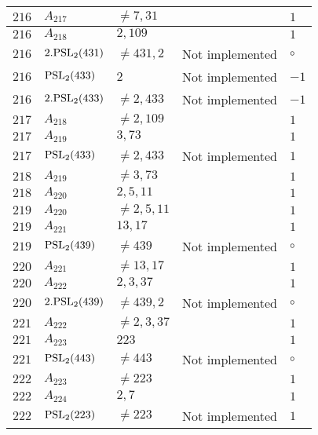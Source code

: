 \documentclass[a4paper, 11pt]{article}
\begin{document}
\begin{longtable}{lllll}
        $ 216 $ & $ A_{217} $ & $ \neq 7, 31 $ & $ ~ $ & $ 1  $ \\ \hline
        $ 216 $ & $ A_{218} $ & $ 2, 109 $ & $ ~ $ & $ 1  $ \\ \hline
        $ 216 $ & $ 2.{\rm PSL}_{2}(431) $ & $ \neq 431, 2 $ & Not implemented & $\circ$ \\ \hline
        $ 216 $ & $ {\rm PSL}_{2}(433) $ & $ 2 $ & Not implemented & $ -1  $ \\ \hline
        $ 216 $ & $ 2.{\rm PSL}_{2}(433) $ & $ \neq 2, 433 $ & Not implemented & $ -1  $ \\ \hline
        $ 217 $ & $ A_{218} $ & $ \neq 2, 109 $ & $ ~ $ & $ 1  $ \\ \hline
        $ 217 $ & $ A_{219} $ & $ 3, 73 $ & $ ~ $ & $ 1  $ \\ \hline
        $ 217 $ & $ {\rm PSL}_{2}(433) $ & $ \neq 2, 433 $ & Not implemented & $ 1  $ \\ \hline
        $ 218 $ & $ A_{219} $ & $ \neq 3, 73 $ & $ ~ $ & $ 1  $ \\ \hline
        $ 218 $ & $ A_{220} $ & $ 2, 5, 11 $ & $ ~ $ & $ 1  $ \\ \hline
        $ 219 $ & $ A_{220} $ & $ \neq 2, 5, 11 $ & $ ~ $ & $ 1  $ \\ \hline
        $ 219 $ & $ A_{221} $ & $ 13, 17 $ & $ ~ $ & $ 1  $ \\ \hline
        $ 219 $ & $ {\rm PSL}_{2}(439) $ & $ \neq 439 $ & Not implemented & $\circ$ \\ \hline
        $ 220 $ & $ A_{221} $ & $ \neq 13, 17 $ & $ ~ $ & $ 1  $ \\ \hline
        $ 220 $ & $ A_{222} $ & $ 2, 3, 37 $ & $ ~ $ & $ 1  $ \\ \hline
        $ 220 $ & $ 2.{\rm PSL}_{2}(439) $ & $ \neq 439, 2 $ & Not implemented & $\circ$ \\ \hline
        $ 221 $ & $ A_{222} $ & $ \neq 2, 3, 37 $ & $ ~ $ & $ 1  $ \\ \hline
        $ 221 $ & $ A_{223} $ & $ 223 $ & $ ~ $ & $ 1  $ \\ \hline
        $ 221 $ & $ {\rm PSL}_{2}(443) $ & $ \neq 443 $ & Not implemented & $\circ$ \\ \hline
        $ 222 $ & $ A_{223} $ & $ \neq 223 $ & $ ~ $ & $ 1  $ \\ \hline
        $ 222 $ & $ A_{224} $ & $ 2, 7 $ & $ ~ $ & $ 1  $ \\ \hline
        $ 222 $ & $ {\rm PSL}_{2}(223) $ & $ \neq 223 $ & Not implemented & $ 1  $ \\ \hline

\end{longtable}
\end{document}
